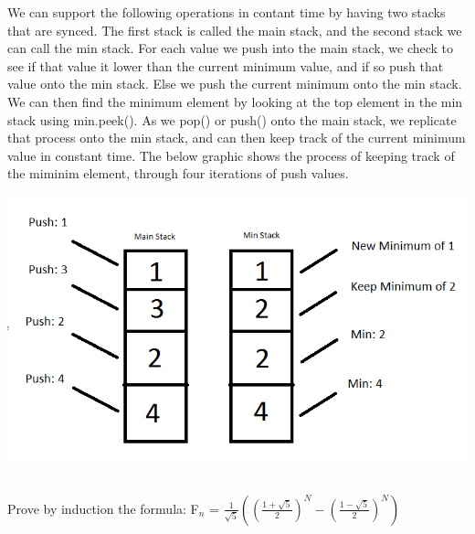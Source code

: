 \documentclass[10pt]{article}
\newenvironment{exercise}[2][Exercise]{\begin{trivlist}
\item[\hskip \labelsep {\bfseries #1}\hskip \labelsep {\bfseries #2.}]}{\end{trivlist}}
\newenvironment{solution}[2][Solution]{\begin{trivlist}
\item[\hskip \labelsep {\bfseries #1}\hskip \labelsep {\bfseries #2.}]}{\end{trivlist}}
\theoremstyle{definition}
\begin{document}
\begin{solution}{(2)}
We can support the following operations in contant time by having two stacks that are synced. The first stack is called the main stack, and the second stack we can call the min stack. For each value we push into the main stack, we check to see if that value it lower than the current minimum value, and if so push that value onto the min stack. Else we push the current minimum onto the min stack.  We can then find the minimum element by looking at the top element in the min stack using min.peek(). As we pop() or push() onto the main stack, we replicate that process onto the min stack, and can then keep track of the current minimum value in constant time.   The below graphic shows the process of keeping track of the miminim element, through four iterations of push values.

\includegraphics[width=\linewidth]{Question2new.png}
\\
\\
\end{solution}

\begin{exercise}{(3)} 
Prove by induction the formula:  F$_{n}$ = $\frac{1}{\sqrt{5}}((\frac{1 + \sqrt{5}}{2})^N - (\frac{1 - \sqrt{5}}{2})^N)$
\end{exercise}
\end{document}
